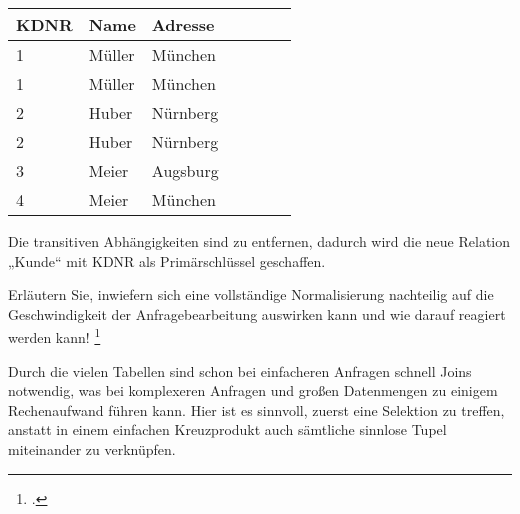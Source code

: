 \documentclass{lehramt-informatik-aufgabe}
\begin{document}
\begin{enumerate}
\begin{antwort}
\begin{tabular}{|l|l|l|l|l|l|l|}
\textbf{KDNR} & \textbf{Name} & \textbf{Adresse}
\\\hline
1    & Müller & München       \\
1    & Müller & München       \\
2    & Huber  & Nürnberg      \\
2    & Huber  & Nürnberg      \\
3    & Meier  & Augsburg      \\
4    & Meier  & München
\end{tabular}

Die transitiven Abhängigkeiten sind zu entfernen, dadurch wird die neue
Relation „Kunde“ mit KDNR als Primärschlüssel geschaffen.
\end{antwort}

Erläutern Sie, inwiefern sich eine vollständige Normalisierung
nachteilig auf die Geschwindigkeit der Anfragebearbeitung auswirken kann
und wie darauf reagiert werden kann!
\footcite[Aufgabe 10: Nachteile der Normalisierung]{db:ab:klausurvorbereitung}

\begin{antwort}
Durch die vielen Tabellen sind schon bei einfacheren Anfragen schnell
Joins notwendig, was bei komplexeren Anfragen und großen Datenmengen zu
einigem Rechenaufwand führen kann. Hier ist es sinnvoll, zuerst eine
Selektion zu treffen, anstatt in einem einfachen Kreuzprodukt
auch sämtliche sinnlose Tupel miteinander zu verknüpfen.
\end{antwort}
\end{enumerate}
\end{document}

